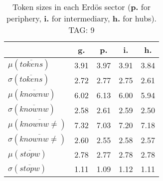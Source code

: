 \begin{table}[h!]
\begin{center}
\begin{tabular}{| l | c | c | c | c |}\hline
 & g. & p. & i. & h. \\\hline
$\mu(\overline{tokens})$ & 3.91  & 3.97  & 3.91  & 3.84 \\\hline
$\sigma(\overline{tokens})$ & 2.72  & 2.77  & 2.75  & 2.61 \\\hline
$\mu(\overline{knownw})$ & 6.02  & 6.13  & 6.00  & 5.94 \\\hline
$\sigma(\overline{knownw})$ & 2.58  & 2.61  & 2.59  & 2.50 \\\hline
$\mu(\overline{knownw \neq})$ & 7.32  & 7.03  & 7.20  & 7.18 \\\hline
$\sigma(\overline{knownw \neq})$ & 2.60  & 2.55  & 2.58  & 2.57 \\\hline
$\mu(\overline{stopw})$ & 2.78  & 2.77  & 2.78  & 2.78 \\\hline
$\sigma(\overline{stopw})$ & 1.11  & 1.09  & 1.12  & 1.11 \\\hline
\end{tabular}
\caption{Token sizes in each Erd\"os sector ({{\bf p.}} for periphery, {{\bf i.}} for intermediary, {{\bf h.}} for hubs). TAG: 9}
\end{center}
\end{table}